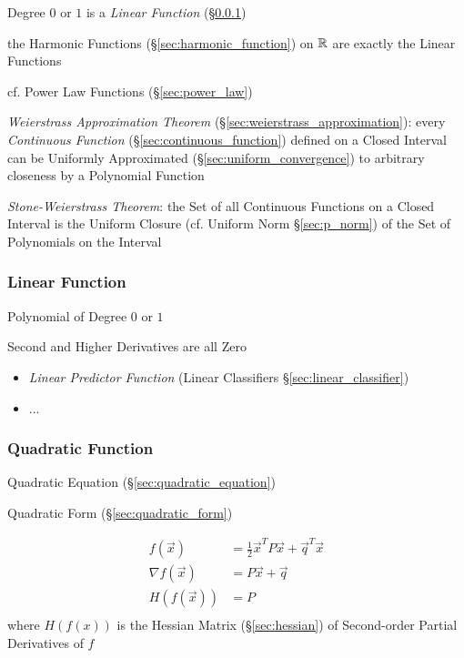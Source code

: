 Degree $0$ or $1$ is a \emph{Linear Function} (\S\ref{sec:linear_function})

the Harmonic Functions (\S\ref{sec:harmonic_function}) on $\mathbb{R}$ are
exactly the Linear Functions

cf. Power Law Functions (\S\ref{sec:power_law})

\emph{Weierstrass Approximation Theorem}
(\S\ref{sec:weierstrass_approximation}): every \emph{Continuous Function}
(\S\ref{sec:continuous_function}) defined on a Closed Interval can be Uniformly
Approximated (\S\ref{sec:uniform_convergence}) to arbitrary closeness by a
Polynomial Function

\emph{Stone-Weierstrass Theorem}: the Set of all Continuous Functions on a
Closed Interval is the Uniform Closure (cf. Uniform Norm \S\ref{sec:p_norm}) of
the Set of Polynomials on the Interval



\subsubsection{Linear Function}\label{sec:linear_function}

Polynomial of Degree $0$ or $1$

Second and Higher Derivatives are all Zero

\begin{itemize}
  \item \emph{Linear Predictor Function} (Linear Classifiers
    \S\ref{sec:linear_classifier})
  \item ...
\end{itemize}



\subsubsection{Quadratic Function}\label{sec:quadratic_function}

\fist Quadratic Equation (\S\ref{sec:quadratic_equation})

\fist Quadratic Form (\S\ref{sec:quadratic_form})

\begin{align*}
  f(\vec{x})        & = \frac{1}{2}\vec{x}^T P \vec{x} + \vec{q}^T\vec{x} \\
  \nabla f(\vec{x}) & = P\vec{x} + \vec{q} \\
  H(f(\vec{x}))     & = P \\
\end{align*}
where $H(f(x))$ is the Hessian Matrix (\S\ref{sec:hessian}) of
Second-order Partial Derivatives of $f$



